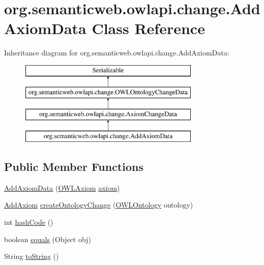 \hypertarget{classorg_1_1semanticweb_1_1owlapi_1_1change_1_1_add_axiom_data}{\section{org.\-semanticweb.\-owlapi.\-change.\-Add\-Axiom\-Data Class Reference}
\label{classorg_1_1semanticweb_1_1owlapi_1_1change_1_1_add_axiom_data}
}
Inheritance diagram for org.\-semanticweb.\-owlapi.\-change.\-Add\-Axiom\-Data\-:\begin{figure}[H]
\begin{center}
\leavevmode
\includegraphics[height=4.000000cm]{classorg_1_1semanticweb_1_1owlapi_1_1change_1_1_add_axiom_data}
\end{center}
\end{figure}
\subsection*{Public Member Functions}
\begin{DoxyCompactItemize}
\item 
\hyperlink{classorg_1_1semanticweb_1_1owlapi_1_1change_1_1_add_axiom_data_a1a58df442f88d7041a5891b50d317634}{Add\-Axiom\-Data} (\hyperlink{interfaceorg_1_1semanticweb_1_1owlapi_1_1model_1_1_o_w_l_axiom}{O\-W\-L\-Axiom} \hyperlink{classorg_1_1semanticweb_1_1owlapi_1_1change_1_1_axiom_change_data_acecb42f3fae836ede3fc37f8c4feb4e4}{axiom})
\item 
\hyperlink{classorg_1_1semanticweb_1_1owlapi_1_1model_1_1_add_axiom}{Add\-Axiom} \hyperlink{classorg_1_1semanticweb_1_1owlapi_1_1change_1_1_add_axiom_data_af73a290cc6115cc6da0bdec39f0af58a}{create\-Ontology\-Change} (\hyperlink{interfaceorg_1_1semanticweb_1_1owlapi_1_1model_1_1_o_w_l_ontology}{O\-W\-L\-Ontology} ontology)
\item 
int \hyperlink{classorg_1_1semanticweb_1_1owlapi_1_1change_1_1_add_axiom_data_ae77c7baa5a9df5e82aaf605d5c950ee4}{hash\-Code} ()
\item 
boolean \hyperlink{classorg_1_1semanticweb_1_1owlapi_1_1change_1_1_add_axiom_data_adb4fe80718691948204b59ed6f44496a}{equals} (Object obj)
\item 
String \hyperlink{classorg_1_1semanticweb_1_1owlapi_1_1change_1_1_add_axiom_data_acfe5e4478508d6e7174493b53bff78e5}{to\-String} ()
\end{DoxyCompactItemize}
